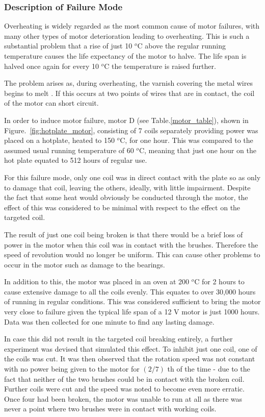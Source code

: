 \subsubsection{Description of Failure Mode}

Overheating is widely regarded as the most common cause of motor failures, with many other types of motor deterioration leading to overheating. This is such a substantial problem that a rise of just 10 $^o$C above the regular running temperature causes the life expectancy of the motor to halve. The life span is halved once again for every 10 $^o$C the temperature is raised further.%

The problem arises as, during overheating, the varnish covering the metal wires begins to melt \cite{wagner1993effects}. If this occurs at two points of wires that are in contact, the coil of the motor can short circuit.


In order to induce motor failure, motor D (see Table.\ref{motor_table}), shown in Figure.~\ref{fig:hotplate_motor}, consisting of 7 coils separately providing power was placed on a hotplate, heated to 150 $^o$C, for one hour. This was compared to the assumed usual running temperature of 60 $^o$C, meaning that just one hour on the hot plate equated to 512 hours of regular use.

For this failure mode, only one coil was in direct contact with the plate so as only to damage that coil, leaving the others, ideally, with little impairment. Despite the fact that some heat would obviously be conducted through the motor, the effect of this was considered to be minimal with respect to the effect on the targeted coil.

The result of just one coil being broken is that there would be a brief loss of power in the motor when this coil was in contact with the brushes. Therefore the speed of revolution would no longer be uniform. This can cause other problems to occur in the motor such as damage to the bearings. 

In addition to this, the motor was placed in an oven at 200 $^o$C for 2 hours to cause extensive damage to all the coils evenly. This equates to over 30,000 hours of running in regular conditions. This was considered sufficient to bring the motor very close to failure given the typical life span of a 12 V motor is just 1000 hours. %
Data was then collected for one minute to find any lasting damage.

In case this did not result in the targeted coil breaking entirely, a further experiment was devised that simulated this effect. To inhibit just one coil, one of the coils was cut. It was then observed that the rotation speed was not constant with no power being given to the motor for $({2}/{7})$ th of the time - due to the fact that neither of the two brushes could be in contact with the broken coil. Further coils were cut and the speed was noted to become even more erratic. Once four had been broken, the motor was unable to run at all as there was never a point where two brushes were in contact with working coils.

